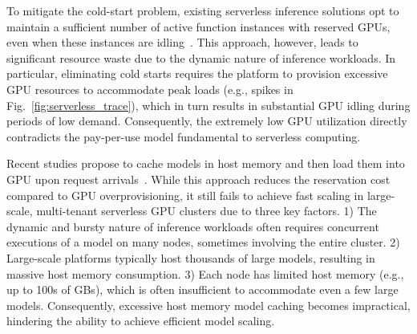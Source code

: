 To mitigate the cold-start problem, existing serverless inference solutions opt to maintain a sufficient number of active function instances with reserved GPUs, even when these instances are idling~\cite{aws_provisioned,yang_infless_2022,fc_billing}. 
This approach, however, leads to significant resource waste due to the dynamic nature of inference workloads. 
In particular, eliminating cold starts requires the platform to provision excessive GPU resources to accommodate peak loads (e.g., spikes in Fig.~\ref{fig:serverless_trace}), which in turn results in substantial GPU idling during periods of low demand. Consequently, the extremely low GPU utilization directly contradicts the pay-per-use model fundamental to serverless computing\cite{faaswap}.  

Recent studies propose to cache models in host memory and then load them into GPU upon request arrivals~\cite{bai_pipeswitch_nodate,deepplan_2023,fu_serverlessllm_2024,faaswap}. 
While this approach reduces the reservation cost compared to GPU overprovisioning, it still fails to achieve fast scaling in large-scale, multi-tenant serverless GPU clusters due to three key factors.
1) The dynamic and bursty nature of inference workloads often requires concurrent executions of a model on many nodes, sometimes involving the entire cluster. 
2) Large-scale platforms typically host thousands of large models, resulting in massive host memory consumption. 
3) Each node has limited host memory (e.g., up to 100s of GBs), which is often insufficient to accommodate even a few large models. 
Consequently, excessive host memory model caching becomes impractical, hindering the ability to achieve efficient model scaling. 

